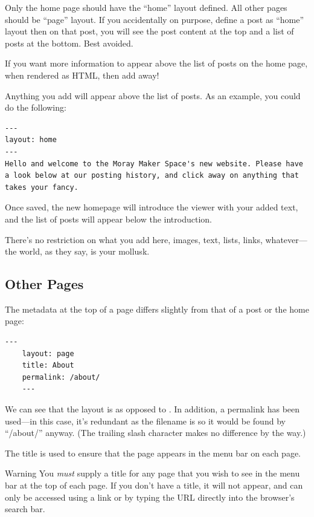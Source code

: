 Only the home page should have the ``home'' layout defined. All other pages should be ``page'' layout. If you accidentally on purpose, define a post as ``home'' layout then on that post, you will see the post content at the top and a list of posts at the bottom. Best avoided.

If you want more information to appear above the list of posts on the home page, when rendered as HTML, then add away!

Anything you add will appear above the list of posts. As an example, you could do the following:

\begin{lstlisting}[caption={Metadata for the ``home'' page's file},style=myText]
---
layout: home
---
Hello and welcome to the Moray Maker Space's new website. Please have a look below at our posting history, and click away on anything that takes your fancy.
\end{lstlisting}

Once saved, the new homepage will introduce the viewer with your added text, and the list of posts will appear below the introduction.

There's no restriction on what you add here, images, text, lists, links, whatever---the world, as they say, is your mollusk.


\subsection{Other Pages}\label{sect: Other Pages}

The metadata at the top of a page differs slightly from that of a post or the home page:

\begin{lstlisting}[caption={Metadata for a ``page'' file},style=myText]
    ---
    layout: page
    title: About
    permalink: /about/
    ---
\end{lstlisting}

We can see that the layout is  as opposed to . In addition, a permalink has been used---in this case, it's redundant as the filename is  so it would be found by ``/about/'' anyway. (The trailing slash character makes no difference by the way.)

The title is used to ensure that the page appears in the menu bar on each page.

\begin{tips}{Warning}
    You \emph{must} supply a title for any page that you wish to see in the menu bar at the top of each page. If you don't have a title, it will not appear, and can only be accessed using a link or by typing the URL directly into the browser's search bar.
\end{tips}


